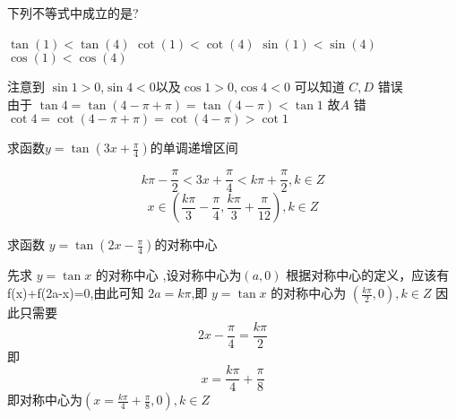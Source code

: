 \documentclass[12pt,answers]{exam}
\begin{document}
{}
\begin{questions}
\question 
{}
\question 下列不等式中成立的是? \fillin[B]
\\
\begin{oneparchoices}
\choice $\tan(1) < \tan(4)$ 
\CorrectChoice $\cot(1) < \cot(4)$
\choice $\sin(1) < \sin(4)$
\choice $\cos(1) < \cos(4)$
\end{oneparchoices}
\begin{solution}
注意到 $\sin{1}>0$,$\sin{4}<0$以及$\cos{1}>0$,$\cos{4}<0$ 可以知道 $C,D$ 错误\\
由于 $\tan{4}=\tan{(4-\pi+\pi)}=\tan{(4-\pi)}<\tan{1}$ 故$A$ 错 \\
$\cot{4}=\cot{(4-\pi+\pi)}=\cot(4-\pi)>\cot{1}$ 

\end{solution}

\question 求函数$y=\tan(3x+\frac{\pi}{4})$的单调递增区间
\begin{solution}
\[k\pi-\frac{\pi}{2}< 3x+\frac{\pi}{4}< k\pi+\frac{\pi}{2},k\in Z\]
\[ x\in (\frac{k\pi}{3}-\frac{\pi}{4},\frac{k\pi}{3}+\frac{\pi}{12} ),k \in Z\]
\end{solution}

\question 求函数 $y=\tan(2x-\frac{\pi}{4})$的对称中心
\begin{solution}
先求 $y=\tan{x}$ 的对称中心 ,设对称中心为$(a,0)$
根据对称中心的定义，应该有 f(x)+f(2a-x)=0,由此可知 $2a=k\pi$,即
$y=\tan{x}$ 的对称中心为 $(\frac{k\pi}{2},0),k\in Z$
因此只需要
\[2x-\frac{\pi}{4} =\frac{k\pi}{2}\]
即 \[x=\frac{k\pi}{4} +\frac{\pi}{8}\]
即对称中心为$(x=\frac{k\pi}{4} +\frac{\pi}{8},0),k\in Z$
\end{solution}


\end{questions}
\end{document}
